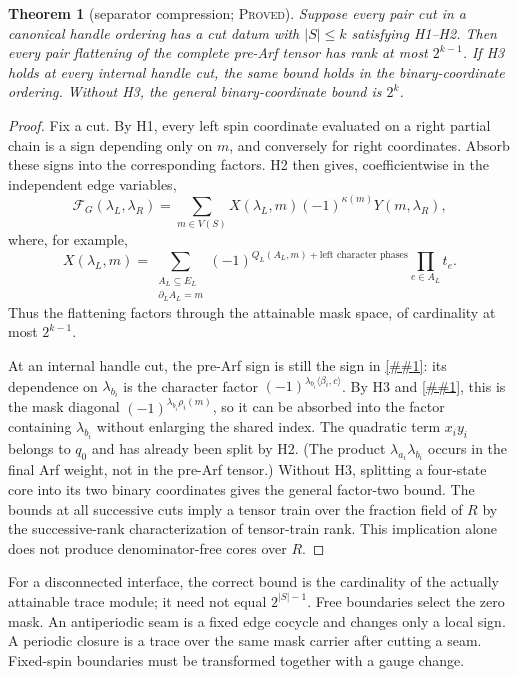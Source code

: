 \documentclass[11pt]{article}
\newcommand{\cref}[1]{\autoref{##1}}%
\newtheorem{theorem}{Theorem}[section]
\newcommand{\cF}{\mathcal F}
\newcommand{\claimtag}[1]{\textsc{#1}}
\newcommand{\proved}{\claimtag{Proved}}
\begin{document}
\begin{theorem}[separator compression; \proved]\label{thm:separator}
Suppose every pair cut in a canonical handle ordering has a cut datum with
\(|S|\leq k\) satisfying H1--H2.  Then every pair flattening of the complete
pre-Arf tensor has rank at most \(2^{k-1}\).  If H3 holds at every internal
handle cut, the same bound holds in the binary-coordinate ordering.  Without
H3, the general binary-coordinate bound is \(2^k\).
\end{theorem}

\begin{proof}
Fix a cut.  By H1, every left spin coordinate evaluated on a right partial
chain is a sign depending only on \(m\), and conversely for right
coordinates.  Absorb these signs into the corresponding factors.  H2 then
gives, coefficientwise in the independent edge variables,
\begin{equation}\label{eq:XY}
 \cF_G(\lambda_L,\lambda_R)
 =\sum_{m\in V(S)}X(\lambda_L,m)(-1)^{\kappa(m)}
                       Y(m,\lambda_R),
\end{equation}
where, for example,
\[
 X(\lambda_L,m)=
 \sum_{\substack{A_L\subseteq E_L\\\partial_LA_L=m}}
 (-1)^{Q_L(A_L,m)+\text{left character phases}}
 \prod_{e\in A_L}t_e .
\]
Thus the flattening factors through the attainable mask space, of cardinality
at most \(2^{k-1}\).

At an internal handle cut, the pre-Arf sign is still the sign in
\cref{eq:q}: its dependence on \(\lambda_{b_i}\) is the character factor
\((-1)^{\lambda_{b_i}\langle\beta_i,c\rangle}\).  By H3 and
\cref{eq:rho}, this is the mask diagonal
\((-1)^{\lambda_{b_i}\rho_i(m)}\), so it can be absorbed into the factor
containing \(\lambda_{b_i}\) without enlarging the shared index.  The
quadratic term \(x_i y_i\) belongs to \(q_0\) and has already been split by
H2.  (The product \(\lambda_{a_i}\lambda_{b_i}\) occurs in the final Arf
weight, not in the pre-Arf tensor.)  Without H3,
splitting a four-state core into its two binary coordinates gives the general
factor-two bound.  The bounds at all successive cuts imply a tensor train
over the fraction field of \(R\) by the successive-rank characterization of
tensor-train rank.  This implication alone does not produce
denominator-free cores over \(R\).
\end{proof}

For a disconnected interface, the correct bound is the cardinality of the
actually attainable trace module; it need not equal \(2^{|S|-1}\).
Free boundaries select the zero mask.  An antiperiodic seam is a fixed edge
cocycle and changes only a local sign.  A periodic closure is a trace over the
same mask carrier after cutting a seam.  Fixed-spin boundaries must be
transformed together with a gauge change.
\end{document}
